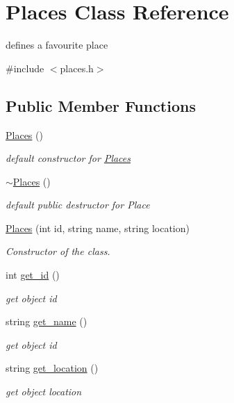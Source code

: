 \hypertarget{classPlaces}{}\section{Places Class Reference}
\label{classPlaces}


defines a favourite place  




{\ttfamily \#include $<$places.\+h$>$}

\subsection*{Public Member Functions}
\begin{DoxyCompactItemize}
\item 
\hyperlink{classPlaces_a0a783d7b0464dd121c69bd93f82f9b87}{Places} ()\hypertarget{classPlaces_a0a783d7b0464dd121c69bd93f82f9b87}{}\label{classPlaces_a0a783d7b0464dd121c69bd93f82f9b87}

\begin{DoxyCompactList}\small\item\em default constructor for \hyperlink{classPlaces}{Places} \end{DoxyCompactList}\item 
\hyperlink{classPlaces_a94a948ece8bfd7bdd52cc16ae55c94a5}{$\sim$\+Places} ()\hypertarget{classPlaces_a94a948ece8bfd7bdd52cc16ae55c94a5}{}\label{classPlaces_a94a948ece8bfd7bdd52cc16ae55c94a5}

\begin{DoxyCompactList}\small\item\em default public destructor for Place \end{DoxyCompactList}\item 
\hyperlink{classPlaces_a3a5489045fba012f7428a5a76daf5a81}{Places} (int id, string name, string location)
\begin{DoxyCompactList}\small\item\em Constructor of the class. \end{DoxyCompactList}\item 
int \hyperlink{classPlaces_a8cd15caa1703fd336bad897b1e2d53bb}{get\+\_\+id} ()
\begin{DoxyCompactList}\small\item\em get object id \end{DoxyCompactList}\item 
string \hyperlink{classPlaces_a4ef51a60e65d562d128993645fc6a6c4}{get\+\_\+name} ()
\begin{DoxyCompactList}\small\item\em get object id \end{DoxyCompactList}\item 
string \hyperlink{classPlaces_a5d087707074477867cea4a0010895b66}{get\+\_\+location} ()
\begin{DoxyCompactList}\small\item\em get object location \end{DoxyCompactList}\end{DoxyCompactItemize}



